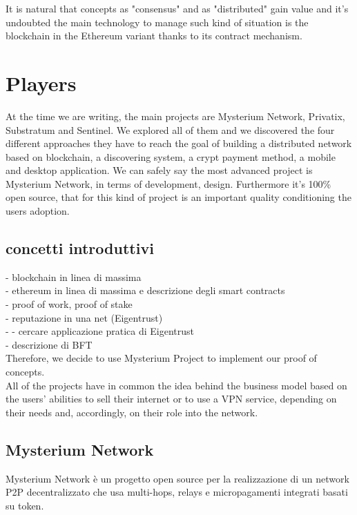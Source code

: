 \documentclass[]{article}
\begin{document}
	It is natural that concepts as "consensus" and as "distributed" gain value and it's undoubted the main technology to manage such kind of situation is the blockchain in the Ethereum variant thanks to its contract mechanism.\\
	
	
	\section{Players}
	At the time we are writing, the main projects are Mysterium Network, Privatix, Substratum and Sentinel. We explored all of them and we discovered the four different approaches they have to reach the goal of building a distributed network based on blockchain, a discovering system, a crypt payment method, a mobile and desktop application. We can safely say the most advanced project is Mysterium Network, in terms of development, design. Furthermore it's 100\% open source, that for this kind of project is an important quality conditioning the users adoption.

	\subsection{concetti introduttivi}
	 - blockchain in linea di massima\\
	 - ethereum in linea di massima e descrizione degli smart contracts\\
	 - proof of work, proof of stake\\
	 - reputazione in una net (Eigentrust)\\
	 - - cercare applicazione pratica di Eigentrust\\
	 - descrizione di BFT\\
	
	Therefore, we decide to use Mysterium Project to implement our proof of concepts.\\
	All of the projects have in common the idea behind the business model based on the users' abilities to sell their internet or to use a VPN service, depending on their needs and, accordingly, on their role into the network.
	
	
	\subsection{Mysterium Network}
	Mysterium Network è un progetto open source per la realizzazione di un network P2P decentralizzato che usa multi-hops, relays e micropagamenti integrati basati su token.	
	
\end{document}
